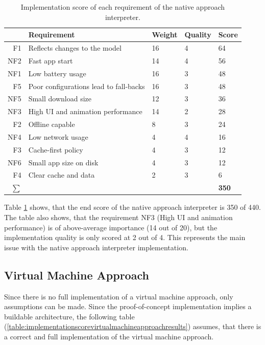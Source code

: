 \begin{table}[h]
	\begin{center}
		\begin{tabular}{r|l|l|l|l}
			& Requirement       & Weight & Quality & Score \\ \hline
			F1 & Reflects changes to the model    & 16 & 4 & 64    \\
			NF2 & Fast app start    & 14 & 4 & 56   \\
			NF1 & Low battery usage            &16  & 3  & 48   \\
			F5 & Poor configurations lead to fall-backs      & 16 & 3 & 48    \\
			NF5 & Small download size    & 12 & 3 & 36    \\
			NF3 & High UI and animation performance      & 14    & 2  & 28 \\
			F2 & Offline capable       & 8 & 3 & 24   \\
			NF4 & Low network usage      & 4    & 4  & 16 \\
			F3 & Cache-first policy       & 4  & 3 & 12  \\
			NF6 & Small app size on disk      & 4  & 3 & 12  \\
			F4 & Clear cache and data       & 2 & 3   & 6   
			\\ \hline
			$\sum$ &    & &    &   \textbf{350}
		\end{tabular}
	\end{center}
	\caption{Implementation score of each requirement of the native approach interpreter.}
	\label{table:implementationscorenativeapproachresults}
\end{table}

Table \ref{table:implementationscorenativeapproachresults} shows, that the end score of the native approach interpreter is 350 of 440.
The table also shows, that the requirement NF3 (High UI and animation performance) is of above-average importance (14 out of 20), but the implementation quality is only scored at 2 out of 4.
This represents the main issue with the native approach interpreter implementation.

\subsection{Virtual Machine Approach}

Since there is no full implementation of a virtual machine approach, only assumptions can be made.
Since the proof-of-concept implementation implies a buildable architecture, the following table (\ref{table:implementationscorevirtualmachineapproachresults}) assumes, that there is a correct and full implementation of the virtual machine approach.

